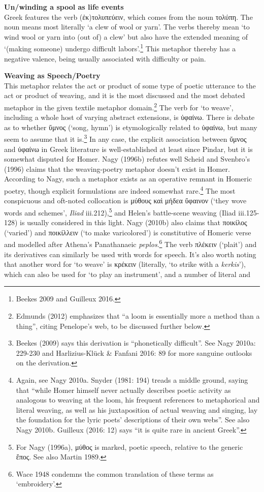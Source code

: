 \documentclass[12pt]{article}
\begin{document}
\noindent \hfill \par
\noindent \textbf{Un/winding a spool as life events} \\
Greek features the verb (ἐκ)τολυπεύειν, which comes from the noun τολύπη. The noun means most literally `a clew of wool or yarn'. The verbs thereby mean `to wind wool or yarn into (out of) a clew' but also have the extended meaning of `(making someone) undergo difficult labors'.\footnote{ Beekes 2009 and Guilleux 2016.} This metaphor thereby has a negative valence, being usually associated with difficulty or pain.

\noindent \hfill \par
\noindent \textbf{Weaving as Speech/Poetry} \\
This metaphor relates the act or product of some type of poetic utterance to the act or product of weaving, and it is the most discussed and the most debated metaphor in the given textile metaphor domain.\footnote{ Edmunds (2012) emphasizes that ``a loom is essentially more a method than a thing'', citing Penelope's web, to be discussed further below.} The verb for `to weave', including a whole host of varying abstract extensions, is ὑφαίνω. There is debate as to whether ὕμνος (`song, hymn') is etymologically related to ὑφαίνω, but many seem to assume that it is.\footnote{ Beekes (2009) says this derivation is ``phonetically difficult''. See Nagy 2010a: 229-230 and Harlizius-Kl\"{u}ck \& Fanfani 2016: 89 for more sanguine outlooks on the derivation.} In any case, the explicit association between ὔμνος and ὐφαίνω in Greek literature is well-established at least since Pindar, but it is somewhat disputed for Homer. Nagy (1996b) refutes well Scheid and Svenbro's (1996) claims that the weaving-poetry metaphor doesn't exist in Homer. According to Nagy, such a metaphor exists as an operative remnant in Homeric poetry, though explicit formulations are indeed somewhat rare.\footnote{Again, see Nagy 2010a. Snyder (1981: 194) treads a middle ground, saying that ``while Homer himself never actually describes poetic activity as analogous to weaving at the loom, his frequent references to metaphorical and literal weaving, as well as his juxtaposition of actual weaving and singing, lay the foundation for the lyric poets' descriptions of their own webs''. See also Nagy 2010b. Guilleux (2016: 12) says ``it is quite rare in ancient Greek''.} The most conspicuous and oft-noted collocation is μύθους καὶ μήδεα ὕφαινον (`they wove words and schemes', \textit{Iliad} iii.212),\footnote{ For Nagy (1996a), μύθος is marked, poetic speech, relative to the generic ἔπος. See also Martin 1989.} and Helen's battle-scene weaving (Iliad iii.125-128) is usually considered in this light. Nagy (2010b) also claims that ποικίλος (`varied') and ποικίλλειν (`to make varicolored') is constitutive of Homeric verse and modelled after Athena's Panathanaeic \textit{peplos}.\footnote{ Wace 1948 condemns the common translation of these terms as `embroidery'.} The verb πλέκειν (`plait') and its derivatives can similarly be used with words for speech. It's also worth noting that another word for `to weave' is κρέκειν (literally, `to strike with a \textit{kerkis}'), which can also be used for `to play an instrument', and a number of literal and 
\end{document}
